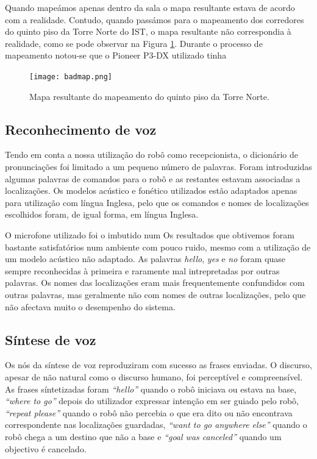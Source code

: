 \documentclass[journal]{IEEEtran}
\begin{document}
Quando mapeámos apenas dentro da sala o mapa resultante estava de acordo com a realidade. Contudo, quando passámos para o mapeamento dos corredores do quinto piso da Torre Norte do IST, o mapa resultante não correspondia à realidade, como se pode observar na Figura \ref{fig:badmap}. Durante o processo de mapeamento notou-se que o Pioneer P3-DX utilizado tinha

\begin{figure}[ht]
  \centering
  \texttt{[image: badmap.png]}
  \caption{Mapa resultante do mapeamento do quinto piso da Torre Norte.}
  \label{fig:badmap}
\end{figure}


\subsection{Reconhecimento de voz}
\label{sec:resuts_recvoice}

Tendo em conta a nossa utilização do robô como recepcionista, o dicionário de pronunciações foi limitado a um pequeno número de palavras. Foram introduzidas algumas palavras de comandos para o robô e as restantes estavam associadas a localizações. Os modelos acústico e fonético utilizados estão adaptados apenas para utilização com língua Inglesa, pelo que os comandos e nomes de localizações escolhidos foram, de igual forma, em língua Inglesa.

O microfone utilizado foi o imbutido num Os resultados que obtivemos foram bastante satisfatórios num ambiente com pouco ruido, mesmo com a utilização de um modelo acústico não adaptado. As palavras \textit{hello}, \textit{yes} e \textit{no} foram quase sempre reconhecidas à primeira e raramente mal intrepretadas por outras palavras. Os nomes das localizações eram mais frequentemente confundidos com outras palavras, mas geralmente não com nomes de outras localizações, pelo que não afectava muito o desempenho do sistema.

\subsection{Síntese de voz}
\label{sec:results_sintvoice}

Os nós da síntese de voz reproduziram com sucesso as frases enviadas. O discurso, apesar de não natural como o discurso humano, foi perceptível e compreensível. As frases síntetizadas foram \textit{``hello''} quando o robô iniciava ou estava na base, \textit{``where to go''} depois do utilizador expressar intenção em ser guiado pelo robô, \textit{``repeat please''} quando o robô não percebia o que era dito ou não encontrava correspondente nas localizações guardadas, \textit{``want to go anywhere else''} quando o robô chega a um destino que não a base e \textit{``goal was canceled''} quando um objectivo é cancelado.
\end{document}

